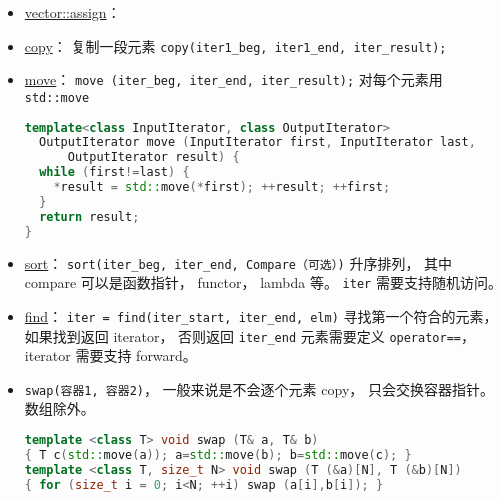 
\begin{issues}
\issueDraft
\end{issues}

\begin{itemize}
\item \href{https://en.cppreference.com/w/cpp/container/vector/assign}{vector::assign}： 
\item \href{https://cplusplus.com/reference/algorithm/copy/}{copy}： 复制一段元素 \verb`copy(iter1_beg, iter1_end, iter_result);`
\item \href{https://cplusplus.com/reference/algorithm/move/}{move}： \verb`move (iter_beg, iter_end, iter_result);` 对每个元素用 \verb`std::move`
\begin{lstlisting}[language=cpp]
template<class InputIterator, class OutputIterator>
  OutputIterator move (InputIterator first, InputIterator last,
      OutputIterator result) {
  while (first!=last) {
    *result = std::move(*first); ++result; ++first;
  }
  return result;
}
\end{lstlisting}
\item \href{https://cplusplus.com/reference/algorithm/sort/}{sort}： \verb`sort(iter_beg, iter_end, Compare（可选）)` 升序排列， 其中 compare 可以是函数指针， functor， lambda 等。 \verb`iter` 需要支持随机访问。
\item \href{https://cplusplus.com/reference/algorithm/find/}{find}： \verb`iter = find(iter_start, iter_end, elm)` 寻找第一个符合的元素， 如果找到返回 iterator， 否则返回 \verb`iter_end` 元素需要定义 \verb`operator==`， iterator 需要支持 forward。
\item \verb`swap(容器1, 容器2)`， 一般来说是不会逐个元素 copy， 只会交换容器指针。 数组除外。
\begin{lstlisting}[language=cpp]
template <class T> void swap (T& a, T& b)
{ T c(std::move(a)); a=std::move(b); b=std::move(c); }
template <class T, size_t N> void swap (T (&a)[N], T (&b)[N])
{ for (size_t i = 0; i<N; ++i) swap (a[i],b[i]); }
\end{lstlisting}
\end{itemize}
